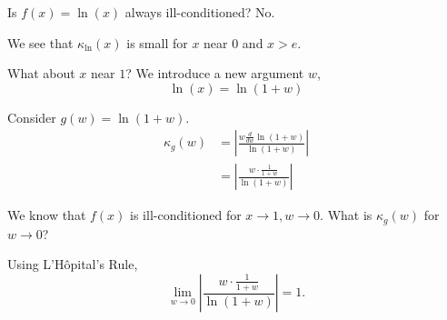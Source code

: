 \begin{example}
    Is \( f(x) = \ln(x) \) always ill-conditioned? No.

    \begin{figure}[H]
        \centering
    \end{figure}

    We see that \( \kappa_{\ln}(x) \) is small for \( x \) near \( 0 \) and \( x > e \).

    What about \( x \) near \( 1 \)? We introduce a new argument \( w \), \[
        \ln(x) = \ln(1 + w)
    \]

    Consider \( g(w) = \ln(1 + w) \).
    \begin{align*}
        \kappa_{g}(w)
         & = \left| \frac{w \frac{d}{dw} \ln(1 + w)}{\ln(1 + w)} \right|
        \\
         & = \left| \frac{w \cdot \frac{1}{1 + w}}{\ln(1 + w)} \right|
    \end{align*}

    We know that \( f(x) \) is ill-conditioned for \( x \to 1, w \to 0 \). What is \( \kappa_{g}(w) \) for \( w \to 0 \)?

    Using L'H\^opital's Rule, \[
        \lim_{w \to 0} \left| \frac{w \cdot \frac{1}{1 + w}}{\ln(1 + w)} \right| = 1.
    \]


\end{example}
